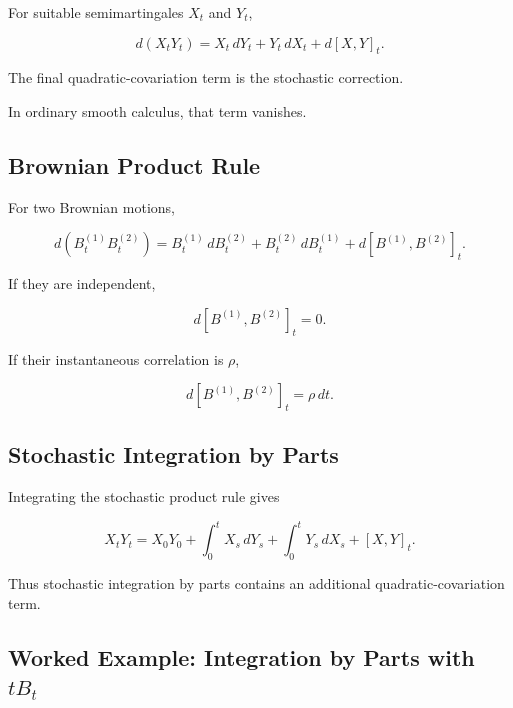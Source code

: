 For suitable semimartingales \(X_t\) and \(Y_t\),

\[
\boxed{
d(X_tY_t)
=
X_t\,dY_t
+
Y_t\,dX_t
+
d[X,Y]_t.
}
\]

The final quadratic-covariation term is the stochastic correction.

In ordinary smooth calculus, that term vanishes.

\subsection{Brownian Product Rule}
\label{subsec:brownian-product-rule}

For two Brownian motions,

\[
d(B_t^{(1)}B_t^{(2)})
=
B_t^{(1)}\,dB_t^{(2)}
+
B_t^{(2)}\,dB_t^{(1)}
+
d[B^{(1)},B^{(2)}]_t.
\]

If they are independent,

\[
d[B^{(1)},B^{(2)}]_t=0.
\]

If their instantaneous correlation is \(\rho\),

\[
d[B^{(1)},B^{(2)}]_t
=
\rho\,dt.
\]

\subsection{Stochastic Integration by Parts}
\label{subsec:stochastic-integration-parts}

Integrating the stochastic product rule gives

\[
\boxed{
X_tY_t
=
X_0Y_0
+
\int_0^t
X_s\,dY_s
+
\int_0^t
Y_s\,dX_s
+
[X,Y]_t.
}
\]

Thus stochastic integration by parts contains an additional
quadratic-covariation term.

\subsection{Worked Example: Integration by Parts with \(tB_t\)}
\label{subsec:worked-integration-parts-tb}

